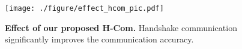 \begin{figure}[t]
    \vspace{-6mm}
    \begin{center}
    \centerline{\texttt{[image: ./figure/effect\_hcom\_pic.pdf]}}
    \caption{
        \textbf{Effect of our proposed H-Com.} Handshake communication significantly improves the communication accuracy.} 
        \label{fig:hcom_effect}
    \vspace{-14mm}
    \end{center}
\end{figure}
